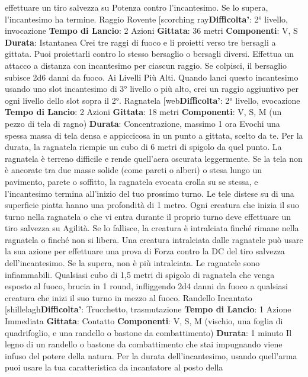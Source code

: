 \begin{multicols}{2}
effettuare un tiro salvezza su Potenza contro
l’incantesimo. Se lo supera, l’incantesimo ha termine.
Raggio Rovente
[scorching ray\textbf{Difficolta'}:
2° livello, invocazione
\textbf{Tempo di Lancio}: 2 Azioni
\textbf{Gittata}: 36 metri
\textbf{Componenti}: V, S
\textbf{Durata}: Istantanea
Crei tre raggi di fuoco e li proietti verso tre bersagli a
gittata. Puoi proiettarli contro lo stesso bersaglio o
bersagli diversi.
Effettua un attacco a distanza con incantesimo per
ciascun raggio. Se colpisci, il bersaglio subisce 2d6
danni da fuoco.
Ai Livelli Più Alti. Quando lanci questo incantesimo
usando uno slot incantesimo di 3° livello o più alto, crei
un raggio aggiuntivo per ogni livello dello slot sopra il
2°.
Ragnatela
[web\textbf{Difficolta'}:
2° livello, evocazione
\textbf{Tempo di Lancio}: 2 Azioni
\textbf{Gittata}: 18 metri
\textbf{Componenti}: V, S, M (un pezzo di tela di ragno)
\textbf{Durata}: Concentrazione, massimo 1 ora
Evochi una spessa massa di tela densa e appiccicosa
in un punto a gittata, scelto da te. Per la durata, la
ragnatela riempie un cubo di 6 metri di spigolo da quel
punto. La ragnatela è terreno difficile e rende quell’aera
oscurata leggermente.
Se la tela non è ancorate tra due masse solide (come
pareti o alberi) o stesa lungo un pavimento, parete o
soffitto, la ragnatela evocata crolla su se stessa, e
l’incantesimo termina all’inizio del tuo prossimo turno.
Le tele distese su di una superficie piatta hanno una
profondità di 1 metro.
Ogni creatura che inizia il suo turno nella ragnatela o
che vi entra durante il proprio turno deve effettuare un
tiro salvezza su Agilità. Se lo fallisce, la creatura è
intralciata finché rimane nella ragnatela o finché non si
libera.
Una creatura intralciata dalle ragnatele può usare la
sua azione per effettuare una prova di Forza contro la
DC del tiro salvezza dell’incantesimo. Se la supera, non
è più intralciata.
Le ragnatele sono infiammabili. Qualsiasi cubo di 1,5
metri di spigolo di ragnatela che venga esposto al
fuoco, brucia in 1 round, infliggendo 2d4 danni da fuoco
a qualsiasi creatura che inizi il suo turno in mezzo al
fuoco.
Randello Incantato
[shillelagh\textbf{Difficolta'}:
Trucchetto, trasmutazione
\textbf{Tempo di Lancio}: 1 Azione Immediata
\textbf{Gittata}: Contatto
\textbf{Componenti}: V, S, M (vischio, una foglia di
quadrifoglio, e una randello o bastone da
combattimento)
\textbf{Durata}: 1 minuto
Il legno di un randello o bastone da combattimento che
stai impugnando viene infuso del potere della natura.
Per la durata dell’incantesimo, usando quell’arma puoi
usare la tua caratteristica da incantatore al posto della

\end{multicols}
